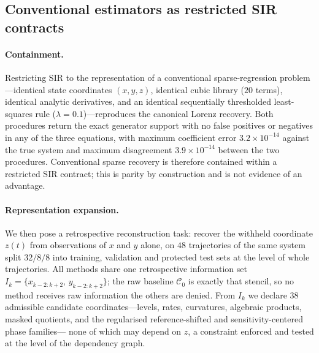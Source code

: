 %

\subsection{Conventional estimators as restricted SIR contracts}
\label{sec:nested-representation}

\paragraph{Containment.}
Restricting SIR to the representation of a conventional sparse-regression
problem---identical state coordinates $(x,y,z)$, identical cubic library
($20$ terms), identical analytic derivatives, and an identical sequentially
thresholded least-squares rule ($\lambda=0.1$)---reproduces the canonical Lorenz
recovery. Both procedures return the exact generator support with no false
positives or negatives in any of the three equations, with maximum coefficient
error $3.2\times10^{-14}$ against the true system and maximum disagreement
$3.9\times10^{-14}$ between the two procedures. Conventional sparse recovery is
therefore contained within a restricted SIR contract; this is parity by
construction and is not evidence of an advantage.

\paragraph{Representation expansion.}
We then pose a retrospective reconstruction task: recover the withheld
coordinate $z(t)$ from observations of $x$ and $y$ alone, on $48$ trajectories
of the same system split $32/8/8$ into training, validation and protected test
sets at the level of whole trajectories. All methods share one retrospective
information set $I_k=\{x_{k-2:k+2},\,y_{k-2:k+2}\}$; the raw baseline
$\mathcal{C}_0$ is exactly that stencil, so no method receives raw information
the others are denied. From $I_k$ we declare $38$ admissible candidate
coordinates---levels, rates, curvatures, algebraic products, masked quotients,
and the regularised reference-shifted and sensitivity-centered phase families---
none of which may depend on $z$, a constraint enforced and tested at the level
of the dependency graph.

